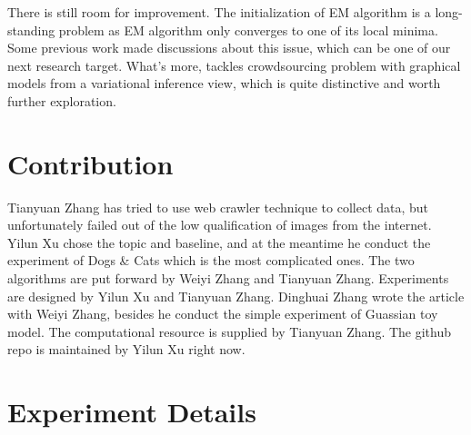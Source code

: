 \documentclass{article}
\begin{document}
There is still room for improvement. The initialization of EM algorithm is a long-standing problem as EM algorithm only converges to one of its local minima. Some previous work \cite{zhang2014spectral} made discussions about this issue, which can be one of our next research target. What's more,  \cite{liu2012variational} tackles crowdsourcing problem with graphical models from a variational inference view, which is quite distinctive and worth further exploration.

{\small
\section*{Contribution}
Tianyuan Zhang has tried to use web crawler technique to collect data, but unfortunately failed out of the low qualification of images from the internet. Yilun Xu chose the topic and baseline, and at the meantime he conduct the experiment of Dogs & Cats which is the most complicated ones. The two algorithms are put forward by Weiyi Zhang and Tianyuan Zhang. Experiments are designed by Yilun Xu and Tianyuan Zhang.  Dinghuai Zhang wrote the article with Weiyi Zhang, besides he conduct the simple experiment of Guassian toy model. The computational resource is supplied by Tianyuan Zhang. The github repo is maintained by Yilun Xu right now.
}

 
\appendix
\section{Experiment Details}

\end{document}
